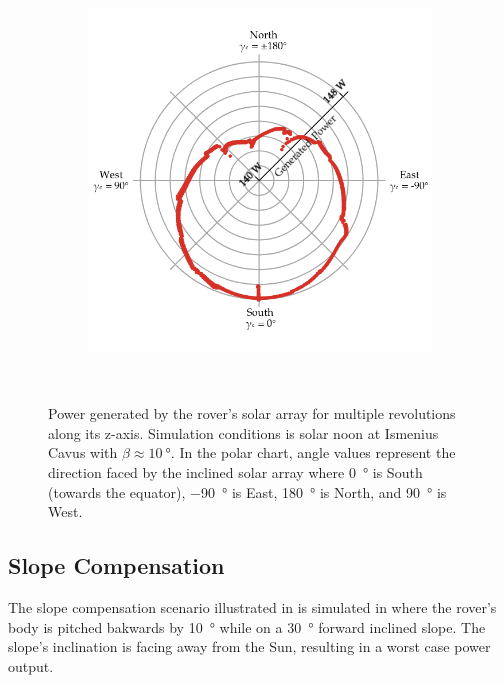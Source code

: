 \begin{figure}[h]
\begin{subfigure}[t]{\subfigureWidth}
        \includegraphics[height=\graphicsHeight]{sections/power-system-design/simulation/plots/zaxis-revolutions-polar.png}
		\label{fig:sub:simulation-data-rover-revolution-generated-power-polar-chart}
	\end{subfigure}\\[0.6ex]
    \caption[Power generated by the rover's solar array for multiple revolutions along its z-axis]
            {Power generated by the rover's solar array for multiple revolutions along its z-axis. Simulation conditions is solar noon at Ismenius Cavus with $\beta \approx \SI{10}{\degree}$. In the polar chart, angle values represent the direction faced by the inclined solar array where \SI{0}{\degree} is South (towards the equator), \SI{-90}{\degree} is East, \SI{180}{\degree} is North, and \SI{90}{\degree} is West.}
    \label{fig:simulation-data-rover-revolution-generated-power}
\vspace{-2ex}
\end{figure}


\subsection{Slope Compensation}

The slope compensation scenario illustrated in  is simulated in  where the rover's body is pitched bakwards by \SI{10}{\degree} while on a \SI{30}{\degree} forward inclined slope. The slope's inclination is facing away from the Sun, resulting in a worst case power output.

